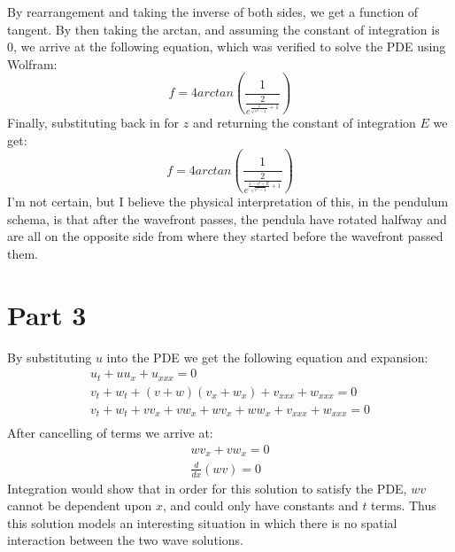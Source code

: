 \documentclass{article}
\begin{document}
By rearrangement and taking the inverse of both sides, we get a function of tangent. By then taking the arctan, and assuming the constant of integration is 0, we arrive at the following equation, which was verified to solve the PDE using Wolfram:
\begin{equation}
f = 4arctan(\frac{1}{\frac{2}{e^{\frac{z}{\sqrt{c^2-1}}+1}}})
\end{equation}
Finally, substituting back in for $z$ and returning the constant of integration $E$ we get:
\begin{equation}
f = 4arctan(\frac{1}{\frac{2}{e^{\frac{x-ct + E}{\sqrt{c^2-1}}+1}}})
\end{equation}
I'm not certain, but I believe the physical interpretation of this, in the pendulum schema, is that after the wavefront passes, the pendula have rotated halfway and are all on the opposite side from where they started before the wavefront passed them.
\section*{Part 3}
By substituting $u$ into the PDE we get the following equation and expansion:
\begin{equation}
\begin{aligned}
u_t +uu_x + u_{xxx} = 0\\
v_t + w_t + (v + w)(v_x + w_x) + v_{xxx} + w_{xxx} = 0\\
v_t + w_t + vv_x + vw_x + wv_x +ww_x + v_{xxx} + w_{xxx} = 0\\
\end{aligned}
\end{equation}
After cancelling of terms we arrive at:
\begin{equation}
\begin{aligned}
wv_x + vw_x = 0\\
\frac{d}{dx}(wv) = 0
\end{aligned}
\end{equation}
Integration would show that in order for this solution to satisfy the PDE, $wv$ cannot be dependent upon $x$, and could only have constants and $t$ terms. Thus this solution models an interesting situation in which there is no spatial interaction between the two wave solutions.
\end{document}
